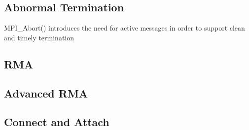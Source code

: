 
\subsection{Abnormal Termination}

MPI_Abort() introduces the need for active messages in order to support clean
and timely termination


\subsection{RMA}


\subsection{Advanced RMA}


\subsection{Connect and Attach}

